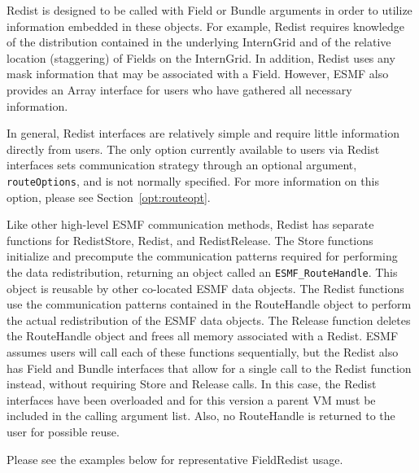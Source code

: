 Redist is designed to be called with Field or Bundle arguments in order to
utilize information embedded in these objects.  For example, Redist requires
knowledge of the distribution contained in the underlying InternGrid and of the
relative location (staggering) of Fields on the InternGrid.  In addition, Redist uses
any mask information that may be associated with a Field.  However, ESMF also
provides an Array interface for users who have gathered all necessary
information.

In general, Redist interfaces are relatively simple and require little
information directly from users.  The only option currently available to users
via Redist interfaces sets communication strategy through an optional argument,
{\tt routeOptions}, and is not normally specified.  For more information on
this option, please see Section~\ref{opt:routeopt}.

Like other high-level ESMF communication methods, Redist has separate
functions for RedistStore, Redist, and RedistRelease.  The Store functions
initialize and precompute the communication patterns required for performing
the data redistribution, returning an object called an {\tt ESMF\_RouteHandle}.
This object is reusable by other co-located ESMF data objects.
The Redist functions use the communication patterns contained in the RouteHandle
object to perform the actual redistribution of the ESMF data objects.  The
Release function deletes the RouteHandle object and frees all memory associated
with a Redist.  ESMF assumes users will call each of these functions
sequentially, but the Redist also has Field and Bundle interfaces that allow for
a single call to the Redist function instead, without requiring Store and
Release calls.  In this case, the Redist interfaces have been overloaded and
for this version a parent VM must be included in the calling argument list.
Also, no RouteHandle is returned to the user for possible reuse.

Please see the examples below for representative FieldRedist usage.



